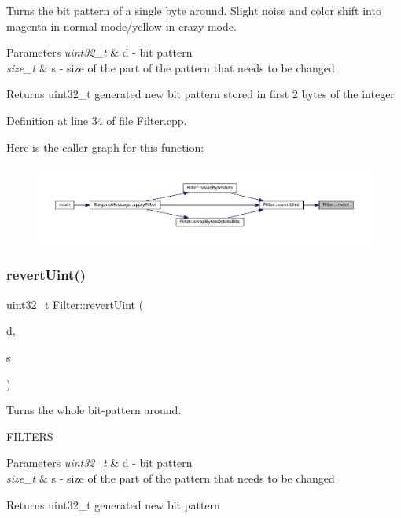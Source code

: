 Turns the bit pattern of a single byte around. Slight noise and color shift into magenta in normal mode/yellow in crazy mode. 


\begin{DoxyParams}{Parameters}
{\em uint32\+\_\+t} & d -\/ bit pattern \\
\hline
{\em size\+\_\+t} & s -\/ size of the part of the pattern that needs to be changed \\
\hline
\end{DoxyParams}
\begin{DoxyReturn}{Returns}
uint32\+\_\+t generated new bit pattern stored in first 2 bytes of the integer 
\end{DoxyReturn}


Definition at line 34 of file Filter.\+cpp.

Here is the caller graph for this function\+:\nopagebreak
\begin{figure}[H]
\begin{center}
\leavevmode
\includegraphics[width=350pt]{classFilter_a55f792b3f87991db5a5e666827d6214c_icgraph}
\end{center}
\end{figure}
\mbox{\label{classFilter_ae4a4b081886014742d083d9a2b285981}} 
\subsubsection{\texorpdfstring{revertUint()}{revertUint()}}
{\footnotesize\ttfamily uint32\+\_\+t Filter\+::revert\+Uint (\begin{DoxyParamCaption}\item[{uint32\+\_\+t}]{d,  }\item[{size\+\_\+t}]{s }\end{DoxyParamCaption})\hspace{0.3cm}{\ttfamily [static]}}



Turns the whole bit-\/pattern around. 

F\+I\+L\+T\+E\+RS
\begin{DoxyParams}{Parameters}
{\em uint32\+\_\+t} & d -\/ bit pattern \\
\hline
{\em size\+\_\+t} & s -\/ size of the part of the pattern that needs to be changed \\
\hline
\end{DoxyParams}
\begin{DoxyReturn}{Returns}
uint32\+\_\+t generated new bit pattern 
\end{DoxyReturn}


